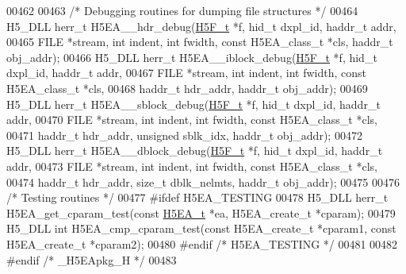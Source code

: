\begin{DoxyCode}
00462 
00463 \textcolor{comment}{/* Debugging routines for dumping file structures */}
00464 H5\_DLL herr\_t H5EA\_\_hdr\_debug(\hyperlink{struct_h5_f__t}{H5F\_t} *f, hid\_t dxpl\_id, haddr\_t addr,
00465     FILE *stream, \textcolor{keywordtype}{int} indent, \textcolor{keywordtype}{int} fwidth, \textcolor{keyword}{const} H5EA\_class\_t *cls, haddr\_t obj\_addr);
00466 H5\_DLL herr\_t H5EA\_\_iblock\_debug(\hyperlink{struct_h5_f__t}{H5F\_t} *f, hid\_t dxpl\_id, haddr\_t addr,
00467     FILE *stream, \textcolor{keywordtype}{int} indent, \textcolor{keywordtype}{int} fwidth, \textcolor{keyword}{const} H5EA\_class\_t *cls,
00468     haddr\_t hdr\_addr, haddr\_t obj\_addr);
00469 H5\_DLL herr\_t H5EA\_\_sblock\_debug(\hyperlink{struct_h5_f__t}{H5F\_t} *f, hid\_t dxpl\_id, haddr\_t addr,
00470     FILE *stream, \textcolor{keywordtype}{int} indent, \textcolor{keywordtype}{int} fwidth, \textcolor{keyword}{const} H5EA\_class\_t *cls,
00471     haddr\_t hdr\_addr, \textcolor{keywordtype}{unsigned} sblk\_idx, haddr\_t obj\_addr);
00472 H5\_DLL herr\_t H5EA\_\_dblock\_debug(\hyperlink{struct_h5_f__t}{H5F\_t} *f, hid\_t dxpl\_id, haddr\_t addr,
00473     FILE *stream, \textcolor{keywordtype}{int} indent, \textcolor{keywordtype}{int} fwidth, \textcolor{keyword}{const} H5EA\_class\_t *cls,
00474     haddr\_t hdr\_addr, \textcolor{keywordtype}{size\_t} dblk\_nelmts, haddr\_t obj\_addr);
00475 
00476 \textcolor{comment}{/* Testing routines */}
00477 \textcolor{preprocessor}{#ifdef H5EA\_TESTING}
00478 H5\_DLL herr\_t H5EA\_get\_cparam\_test(\textcolor{keyword}{const} \hyperlink{struct_h5_e_a__t}{H5EA\_t} *ea, H5EA\_create\_t *cparam);
00479 H5\_DLL \textcolor{keywordtype}{int} H5EA\_cmp\_cparam\_test(\textcolor{keyword}{const} H5EA\_create\_t *cparam1, \textcolor{keyword}{const} H5EA\_create\_t *cparam2);
00480 \textcolor{preprocessor}{#endif }\textcolor{comment}{/* H5EA\_TESTING */}\textcolor{preprocessor}{}
00481 
00482 \textcolor{preprocessor}{#endif }\textcolor{comment}{/* \_H5EApkg\_H */}\textcolor{preprocessor}{}
00483 
\end{DoxyCode}
